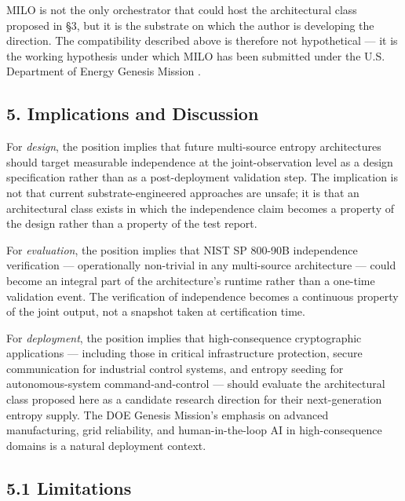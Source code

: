 MILO is not the only orchestrator that could host the architectural
class proposed in §3, but it is the substrate on which the author is
developing the direction. The compatibility described above is therefore
not hypothetical --- it is the working hypothesis under which MILO has
been submitted under the U.S. Department of Energy Genesis Mission
\cite{ref9}.

\subsection{5. Implications and
Discussion}\label{implications-and-discussion}

For \emph{design}, the position implies that future multi-source entropy
architectures should target measurable independence at the
joint-observation level as a design specification rather than as a
post-deployment validation step. The implication is not that current
substrate-engineered approaches are unsafe; it is that an architectural
class exists in which the independence claim becomes a property of the
design rather than a property of the test report.

For \emph{evaluation}, the position implies that NIST SP 800-90B
independence verification --- operationally non-trivial in any
multi-source architecture --- could become an integral part of the
architecture's runtime rather than a one-time validation event. The
verification of independence becomes a continuous property of the joint
output, not a snapshot taken at certification time.

For \emph{deployment}, the position implies that high-consequence
cryptographic applications --- including those in critical
infrastructure protection, secure communication for industrial control
systems, and entropy seeding for autonomous-system command-and-control
--- should evaluate the architectural class proposed here as a candidate
research direction for their next-generation entropy supply. The DOE
Genesis Mission's emphasis on advanced manufacturing, grid reliability,
and human-in-the-loop AI in high-consequence domains \cite{ref9} is a
natural deployment context.

\subsection{5.1 Limitations}\label{limitations}

